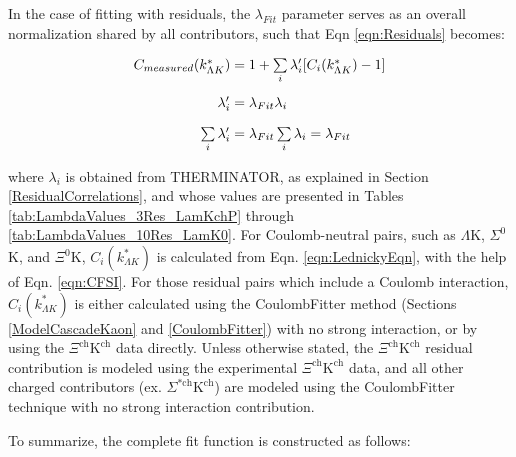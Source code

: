 \documentclass[../AnalysisNoteJBuxton.tex]{subfiles}
\begin{document}
In the case of fitting with residuals, the $\lambda_{Fit}$ parameter serves as an overall normalization shared by all contributors, such that Eqn \ref{eqn:Residuals} becomes:

\begin{equation}
\begin{array}{r@{}l}
    C_{measured}(k^{*}_{\Lambda K}) &{}= 1 + \sum\limits_{i}\lambda_{i}'[C_{i}(k^{*}_{\Lambda K})-1]\\[15pt]
    \lambda_{i}' &{}= \lambda_{Fit}\lambda_{i} \\[10pt]
    \sum\limits_{i}\lambda_{i}' &{}=  \lambda_{Fit}\sum\limits_{i}\lambda_{i} = \lambda_{Fit}
\end{array}
\label{eqn:ResidualsvLambdaNorm}
\end{equation}

where $\lambda_{i}$ is obtained from THERMINATOR, as explained in Section \ref{ResidualCorrelations}, and whose values are presented in Tables \ref{tab:LambdaValues_3Res_LamKchP} through \ref{tab:LambdaValues_10Res_LamK0}.  For Coulomb-neutral pairs, such as $\Lambda$K, $\Sigma^{0}$K, and $\Xi^{0}$K, $C_{i}(k^{*}_{\Lambda K})$ is calculated from Eqn. \ref{eqn:LednickyEqn}, with the help of Eqn. \ref{eqn:CFSI}.  For those residual pairs which include a Coulomb interaction, $C_{i}(k^{*}_{\Lambda K})$ is either calculated using the CoulombFitter method (Sections \ref{ModelCascadeKaon} and \ref{CoulombFitter}) with no strong interaction, or by using the $\Xi^{\mathrm{ch}}\mathrm{K^{ch}}$ data directly.  Unless otherwise stated, the $\Xi^{\mathrm{ch}}\mathrm{K^{ch}}$ residual contribution is modeled using the experimental $\Xi^{\mathrm{ch}}\mathrm{K^{ch}}$ data, and all other charged contributors (ex. $\Sigma^{*\mathrm{ch}}\mathrm{K^{ch}}$) are modeled using the CoulombFitter technique with no strong interaction contribution.

To summarize, the complete fit function is constructed as follows:
\end{document}
